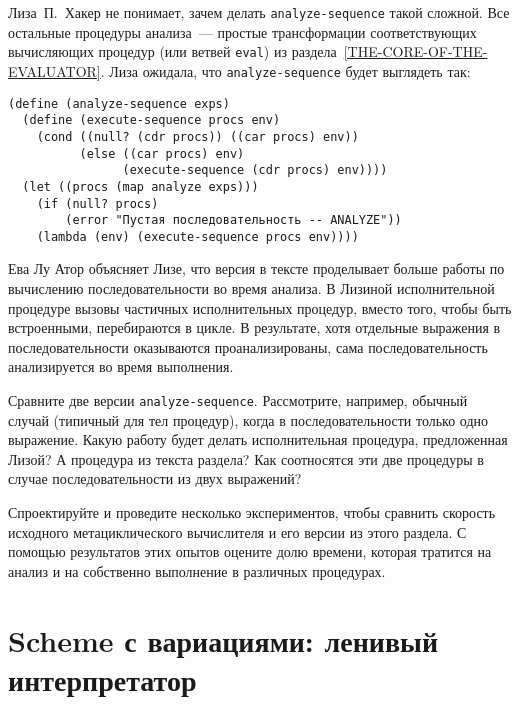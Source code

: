 \begin{exercise}{4.23}%
\label{EX4.23}%
Лиза~П.~Хакер не понимает, зачем делать
{\tt analyze-sequence} такой сложной.  Все остальные процедуры
анализа~--- простые трансформации соответствующих вычисляющих процедур
(или ветвей {\tt eval}) из
раздела~\ref{THE-CORE-OF-THE-EVALUATOR}.  Лиза ожидала,
что {\tt analyze-se\-quence} будет выглядеть 
так:

\begin{Verbatim}[fontsize=\small]
(define (analyze-sequence exps)
  (define (execute-sequence procs env)
    (cond ((null? (cdr procs)) ((car procs) env))
          (else ((car procs) env)
                (execute-sequence (cdr procs) env))))
  (let ((procs (map analyze exps)))
    (if (null? procs)
        (error "Пустая последовательность -- ANALYZE"))
    (lambda (env) (execute-sequence procs env))))
\end{Verbatim}
Ева Лу Атор объясняет Лизе, что версия в тексте проделывает больше
работы по вычислению последовательности во время анализа.  В Лизиной
исполнительной процедуре вызовы частичных исполнительных процедур, вместо
того, чтобы быть встроенными, перебираются в цикле.  В результате,
хотя отдельные выражения в последовательности оказываются
проанализированы, сама последовательность анализируется во время
выполнения.

Сравните две версии {\tt analyze-sequence}.
Рассмотрите, например, обычный случай (типичный для тел процедур),
когда в последовательности только одно выражение.  Какую работу будет
делать исполнительная процедура, предложенная Лизой?  А процедура из
текста раздела?  Как соотносятся эти две процедуры в случае
последовательности из двух выражений?
\end{exercise}

\begin{exercise}{4.24}%
\label{EX4.24}%
Спроектируйте и проведите несколько экспериментов, чтобы
сравнить скорость исходного метациклического вычислителя и его версии из
этого раздела.  С помощью результатов этих опытов оцените долю
времени, которая тратится на анализ и на собственно выполнение в
различных процедурах.
\end{exercise}

\section{Scheme с вариациями: ленивый интерпретатор}
\label{VARIATIONS-ON-A-SCHEME-LAZY-EVALUATION}%


